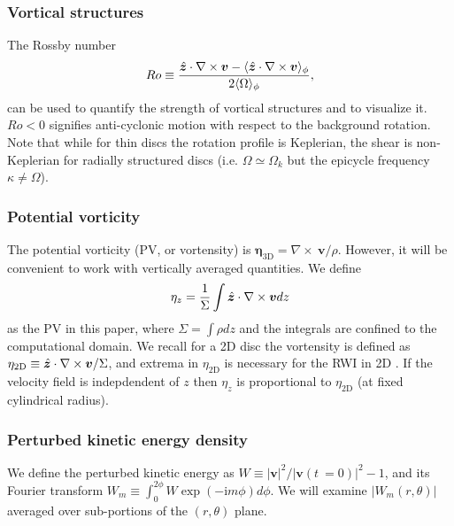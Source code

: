 \subsubsection{Vortical structures}
The Rossby number
\begin{align}
  Ro \equiv
  \frac{\hat{\bm{z}}\cdot\nabla\times\bm{v}-\langle \hat{\bm{z}}\cdot\nabla\times\bm{v} \rangle_\phi}{2\langle \Omega \rangle_\phi},   
\end{align} 
can be used to quantify the strength of vortical structures and to
visualize it. $Ro<0$ signifies anti-cyclonic motion with respect to
the background rotation. Note that while for thin discs 
the rotation profile is Keplerian, the shear is non-Keplerian for radially  
structured discs (i.e. $\Omega\simeq\Omega_k$ but the epicycle
frequency $\kappa\neq\Omega$). 

\subsubsection{Potential vorticity}
The potential vorticity (PV, or vortensity) is 
$  \bm{\eta}_\mathrm{3D} = \nabla\times~\bm{v}/\rho$. 
However, it will be convenient to work with vertically averaged
quantities. We define  
\begin{align}
  \eta_z = \frac{1}{\Sigma}\int \hat{\bm{z}}\cdot\nabla\times\bm{v} dz
\end{align}
as the PV in this paper, where $\Sigma = \int\rho dz$ and the
integrals are confined to the computational domain. 
We recall for a 2D disc the vortensity is defined as 
$\eta_\mathrm{2D} \equiv \hat{\bm{z}}\cdot\nabla\times\bm{v}/\Sigma$, and
extrema in $\eta_\mathrm{2D}$ is necessary for the RWI in
2D \citep{lovelace99,lin10}. If the velocity field is indepdendent of 
$z$ then $\eta_z$ is proportional to $\eta_\mathrm{2D}$ (at fixed
cylindrical radius).    

\subsubsection{Perturbed kinetic energy density}  
We define the perturbed kinetic energy as
$W\equiv|\bm{v}|^2/|\bm{v}(t~=0)|^2 - 1$, and its Fourier transform 
$W_m\equiv\int_0^{2\phi} W\exp{(-\mathrm{i}m\phi)}d\phi$. We will examine
$|W_m(r,\theta)|$ averaged over sub-portions of the $(r,\theta)$
plane. 
